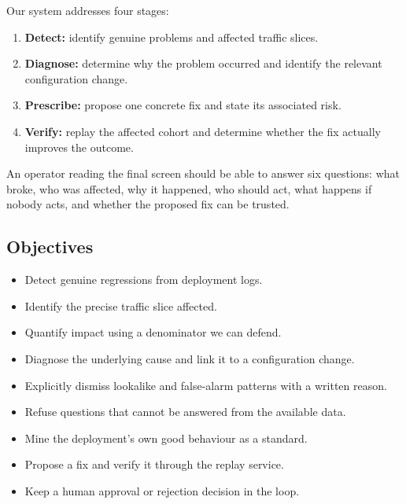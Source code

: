 \documentclass[8pt,twocolumn,a4paper]{extarticle}
\begin{document}
Our system addresses four stages:

\begin{enumerate}
    \item \textbf{Detect:} identify genuine problems and affected
    traffic slices.
    \item \textbf{Diagnose:} determine why the problem occurred and
    identify the relevant configuration change.
    \item \textbf{Prescribe:} propose one concrete fix and state its
    associated risk.
    \item \textbf{Verify:} replay the affected cohort and determine
    whether the fix actually improves the outcome.
\end{enumerate}

An operator reading the final screen should be able to answer six
questions: what broke, who was affected, why it happened, who should
act, what happens if nobody acts, and whether the proposed fix can be
trusted.

\subsection{Objectives}

\begin{itemize}
    \item Detect genuine regressions from deployment logs.
    \item Identify the precise traffic slice affected.
    \item Quantify impact using a denominator we can defend.
    \item Diagnose the underlying cause and link it to a configuration
    change.
    \item Explicitly dismiss lookalike and false-alarm patterns with a
    written reason.
    \item Refuse questions that cannot be answered from the available
    data.
    \item Mine the deployment's own good behaviour as a standard.
    \item Propose a fix and verify it through the replay service.
    \item Keep a human approval or rejection decision in the loop.
\end{itemize}

\end{document}
